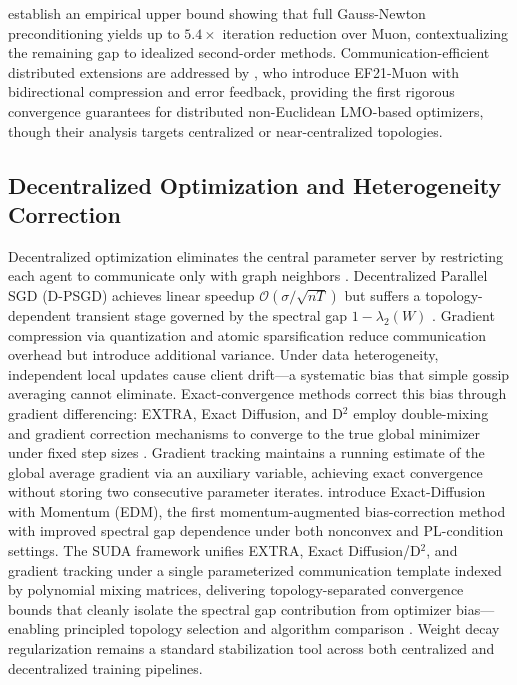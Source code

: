 \documentclass[11pt]{article}
\begin{document}
establish an empirical upper bound showing that full Gauss-Newton preconditioning yields up to $5.4\times$ iteration reduction over Muon, contextualizing the remaining gap to idealized second-order methods. Communication-efficient distributed extensions are addressed by \citet{Gruntkowska2025ErrorFF}, who introduce EF21-Muon with bidirectional compression and error feedback, providing the first rigorous convergence guarantees for distributed non-Euclidean LMO-based optimizers, though their analysis targets centralized or near-centralized topologies.

\subsection{Decentralized Optimization and Heterogeneity Correction}

Decentralized optimization eliminates the central parameter server by restricting each agent to communicate only with graph neighbors \citep{Goyal2017AccurateLM}. Decentralized Parallel SGD (D-PSGD) achieves linear speedup $\mathcal{O}(\sigma/\sqrt{nT})$ but suffers a topology-dependent transient stage governed by the spectral gap $1-\lambda_2(W)$ \citep{Kong2024DecentralizedBO}. Gradient compression via quantization \citep{Alistarh2016QSGDCS} and atomic sparsification \citep{Wang2018ATOMOCL} reduce communication overhead but introduce additional variance. Under data heterogeneity, independent local updates cause client drift—a systematic bias that simple gossip averaging cannot eliminate. Exact-convergence methods correct this bias through gradient differencing: EXTRA, Exact Diffusion, and D$^2$ employ double-mixing and gradient correction mechanisms to converge to the true global minimizer under fixed step sizes \citep{Hu2025ABD}. Gradient tracking \citep{Hu2025ABD} maintains a running estimate of the global average gradient via an auxiliary variable, achieving exact convergence without storing two consecutive parameter iterates. \citet{Hu2025ABD} introduce Exact-Diffusion with Momentum (EDM), the first momentum-augmented bias-correction method with improved spectral gap dependence under both nonconvex and PL-condition settings. The SUDA framework unifies EXTRA, Exact Diffusion/D$^2$, and gradient tracking under a single parameterized communication template indexed by polynomial mixing matrices, delivering topology-separated convergence bounds that cleanly isolate the spectral gap contribution from optimizer bias—enabling principled topology selection and algorithm comparison \citep{Kong2024DecentralizedBO}. Weight decay regularization \citep{loshchilov2017decoupled} remains a standard stabilization tool across both centralized and decentralized training pipelines.
\end{document}
